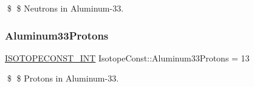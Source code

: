 \$ \$ Neutrons in Aluminum-\/33. \mbox{\label{group___isotope_const-_aluminum-_al33_ga3c6eddbc158b184984a60cad55ab9ebe}} 
\subsubsection{\texorpdfstring{Aluminum33\+Protons}{Aluminum33Protons}}
{\footnotesize\ttfamily \mbox{\hyperlink{group___isotope_const-_macros_ga5f18360b3e99483a35c32d789e62621c}{I\+S\+O\+T\+O\+P\+E\+C\+O\+N\+S\+T\+\_\+\+I\+NT}} Isotope\+Const\+::\+Aluminum33\+Protons = 13}

\$ \$ Protons in Aluminum-\/33. 